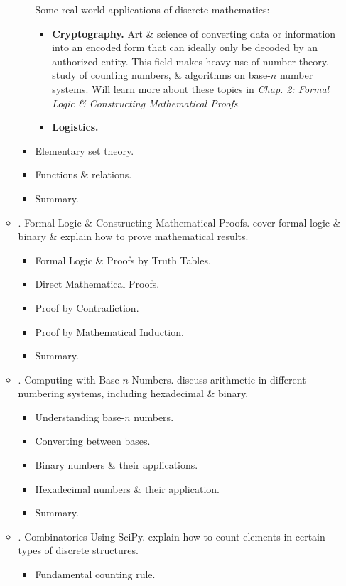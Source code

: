\documentclass{article}
\begin{document}
\begin{enumerate}
\begin{itemize}
\begin{itemize}
			Some real-world applications of discrete mathematics:
			\begin{itemize}
				\item {\bf Cryptography.} Art \& science of converting data or information into an encoded form that can ideally only be decoded by an authorized entity. This field makes heavy use of number theory, study of counting numbers, \& algorithms on base-$n$ number systems. Will learn more about these topics in {\it Chap. 2: Formal Logic \& Constructing Mathematical Proofs}.
				\item {\bf Logistics.}
			\end{itemize}
			\item {\sf Elementary set theory.} 
			\item {\sf Functions \& relations.}
			\item {\sf Summary.}
		\end{itemize}
		\item {. Formal Logic \& Constructing Mathematical Proofs.} cover formal logic \& binary \& explain how to prove mathematical results.
		\begin{itemize}
			\item {\sf Formal Logic \& Proofs by Truth Tables.}
			\item {\sf Direct Mathematical Proofs.}
			\item {\sf Proof by Contradiction.}
			\item {\sf Proof by Mathematical Induction.}
			\item {\sf Summary.}
		\end{itemize}
		\item {. Computing with Base-$n$ Numbers.} discuss arithmetic in different numbering systems, including hexadecimal \& binary.
		\begin{itemize}
			\item {\sf Understanding base-$n$ numbers.}
			\item {\sf Converting between bases.}
			\item {\sf Binary numbers \& their applications.}
			\item {\sf Hexadecimal numbers \& their application.}
			\item {\sf Summary.}
		\end{itemize}
		\item {. Combinatorics Using SciPy.} explain how to count elements in certain types of discrete structures.
		\begin{itemize}
			\item {\sf Fundamental counting rule.}

\end{itemize}
\end{itemize}
\end{enumerate}
\end{document}
